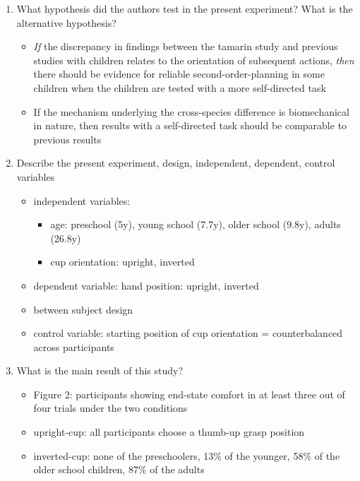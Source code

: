 \documentclass[12pt,english]{scrartcl}
\begin{document}
\begin{enumerate}
\item What hypothesis did the authors test in the present experiment? What is the alternative hypothesis?

 \color{blue}
 \begin{itemize}
 \item \textit{If} the discrepancy in findings between the tamarin study and previous studies with children relates to the orientation of subsequent actions,  \textit{then} there should be evidence for reliable second-order-planning in some children when the children are tested with a more self-directed task
\item If the mechanism underlying the cross-species difference is biomechanical in nature, then results with a self-directed task should be comparable to previous results
 \end{itemize}
  \color{black}

\item Describe the present experiment, design, independent, dependent, control variables

 \color{blue}
 \begin{itemize}
 \item independent variables: 
 \begin{itemize}
  \item age: preschool (5y), young school (7.7y), older school (9.8y), adults (26.8y)
  \item cup orientation: upright, inverted
 \end{itemize}
 
\item dependent variable: hand position: upright, inverted
\item between subject design
\item control variable: starting position of cup orientation = counterbalanced across participants
 \end{itemize}
  \color{black}

\item What is the main result of this study?

 \color{blue}
 \begin{itemize}
 \item Figure 2: participants showing end-state comfort in at least three out of four trials under the two conditions
 \item upright-cup: all participants choose a thumb-up grasp position
 \item inverted-cup: none of the preschoolers, 13\% of the younger, 58\% of the older school children, 87\% of the adults
 \end{itemize}
  \color{black}



\end{enumerate}
\end{document}
